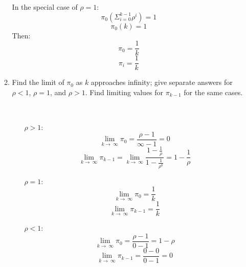 \begin{enumerate}
\begin{enumerate}
        In the special case of $\rho = 1$:
        $$\pi_0 (\Sigma_{i=0}^{k-1} \rho^i) = 1$$
        $$\pi_0 (k) = 1$$
        Then:
        $$\pi_0 = \frac{1}{k}$$
        $$\pi_i = \frac{1}{k}$$
      \item Find the limit of $\pi_0$ as $k$ approaches infinity; give separate answers for $\rho < 1$, $\rho = 1$, and $\rho > 1$. Find limiting values for $\pi_{k-1}$ for the same cases.\\\\\
        
        \begin{itemize}
          \item [$\rho > 1:$]
            $$\lim_{k \to\ \infty} \pi_0 = \frac{\rho - 1}{\infty - 1} = 0$$
            $$\lim_{k \to\ \infty} \pi_{k-1} = \lim_{k \to\ \infty} \frac{1 - \frac{1}{\rho}}{1 - \frac{1}{\rho^k}} = 1 - \frac{1}{\rho}$$
          \item [$\rho = 1$:]
            $$\lim_{k \to\ \infty} \pi_0 = \frac{1}{k}$$
            $$\lim_{k \to\ \infty} \pi_{k-1} = \frac{1}{k}$$
          \item [$\rho < 1$:]
            $$\lim_{k \to\ \infty} \pi_0 = \frac{\rho-1}{0-1} = 1-\rho$$
            $$\lim_{k \to\ \infty} \pi_{k-1} = \frac{0 - 0}{0 - 1} = 0$$
        \end{itemize}
    \end{enumerate}
      
\end{enumerate}


